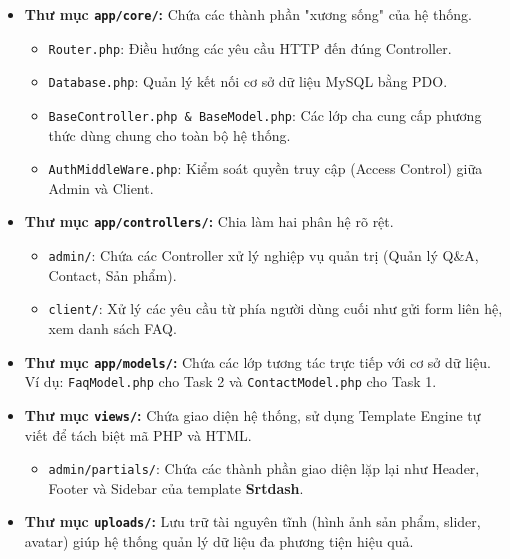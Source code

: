\begin{itemize}
    \item \textbf{Thư mục \texttt{app/core/}:} Chứa các thành phần "xương sống" của hệ thống.
    \begin{itemize}
        \item \texttt{Router.php}: Điều hướng các yêu cầu HTTP đến đúng Controller.
        \item \texttt{Database.php}: Quản lý kết nối cơ sở dữ liệu MySQL bằng PDO.
        \item \texttt{BaseController.php \& BaseModel.php}: Các lớp cha cung cấp phương thức dùng chung cho toàn bộ hệ thống.
        \item \texttt{AuthMiddleWare.php}: Kiểm soát quyền truy cập (Access Control) giữa Admin và Client.
    \end{itemize}
    
    \item \textbf{Thư mục \texttt{app/controllers/}:} Chia làm hai phân hệ rõ rệt.
    \begin{itemize}
        \item \texttt{admin/}: Chứa các Controller xử lý nghiệp vụ quản trị (Quản lý Q\&A, Contact, Sản phẩm).
        \item \texttt{client/}: Xử lý các yêu cầu từ phía người dùng cuối như gửi form liên hệ, xem danh sách FAQ.
    \end{itemize}

    \item \textbf{Thư mục \texttt{app/models/}:} Chứa các lớp tương tác trực tiếp với cơ sở dữ liệu. Ví dụ: \texttt{FaqModel.php} cho Task 2 và \texttt{ContactModel.php} cho Task 1.

    \item \textbf{Thư mục \texttt{views/}:} Chứa giao diện hệ thống, sử dụng Template Engine tự viết để tách biệt mã PHP và HTML.
    \begin{itemize}
        \item \texttt{admin/partials/}: Chứa các thành phần giao diện lặp lại như Header, Footer và Sidebar của template \textbf{Srtdash}.
    \end{itemize}

    \item \textbf{Thư mục \texttt{uploads/}:} Lưu trữ tài nguyên tĩnh (hình ảnh sản phẩm, slider, avatar) giúp hệ thống quản lý dữ liệu đa phương tiện hiệu quả.
\end{itemize}


